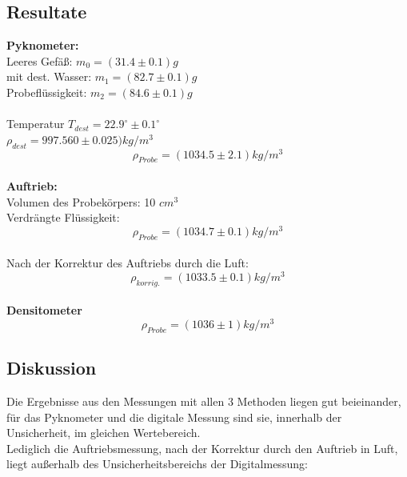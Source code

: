 \documentclass[12pt,a4paper]{article}
\begin{document}
\begin{multicols}{2}
\subsection{Resultate}

\textbf{Pyknometer:}\\
Leeres Gefäß: $m_0 = (31.4 \pm 0.1)g$\\
mit dest. Wasser: $m_1 = (82.7 \pm 0.1)g$\\
Probeflüssigkeit: $m_2 = (84.6 \pm 0.1)g$\\
\\
Temperatur $T_{dest} = 22.9^\circ \pm 0.1^\circ$\\
$\rho_{dest} = 997.560 \pm 0.025) kg/m^3$
$$\rho_{Probe} = (1034.5 \pm 2.1) kg/m^3$$\\



\noindent \textbf{Auftrieb:}\\

\noindent Volumen des Probekörpers: 10 $cm^3$\\
Verdrängte Flüssigkeit:\\
$$\rho_{Probe} = (1034.7 \pm 0.1)kg/m^3$$\\
Nach der Korrektur des Auftriebs durch die Luft:\\
$$\rho_{korrig.} = (1033.5 \pm 0.1)kg/m^3$$\\



\textbf{Densitometer}
$$\rho_{Probe} =   (1036 \pm 1) kg/m^3$$




\subsection{Diskussion}

Die Ergebnisse aus den Messungen mit allen 3 Methoden liegen gut beieinander, für das Pyknometer und die digitale Messung sind sie, innerhalb der Unsicherheit, im gleichen Wertebereich.\\
Lediglich die Auftriebsmessung, nach der Korrektur durch den Auftrieb in Luft, liegt außerhalb des Unsicherheitsbereichs der Digitalmessung:\\


\end{multicols}
\end{document}
